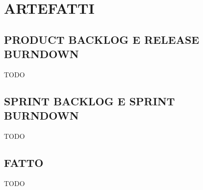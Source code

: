 \newpage
\section*{ARTEFATTI}
\label{sec:artifacts}

\subsection*{PRODUCT BACKLOG E RELEASE BURNDOWN}
\label{sec:productbacklog}
TODO

\subsection*{SPRINT BACKLOG E SPRINT BURNDOWN}
\label{sec:sprintbacklog}
TODO

\subsection*{FATTO}
\label{sec:done}
TODO
